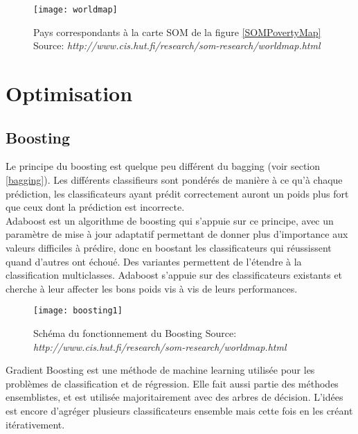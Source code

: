 \begin{figure}[H]
	\texttt{[image: worldmap]}
	\caption{\label{WorldPovertyMap} Pays correspondants à la carte SOM de la figure \ref{SOMPovertyMap} \newline Source: \textit{http://www.cis.hut.fi/research/som-research/worldmap.html}}
\end{figure}





\newpage
\section{Optimisation}

\subsection{Boosting}
Le principe du boosting est quelque peu différent du bagging (voir section \ref{bagging}). Les différents classifieurs sont pondérés de manière à ce qu’à chaque prédiction, les classificateurs ayant prédit correctement auront un poids plus fort que ceux dont la prédiction est incorrecte.\\


\noindent Adaboost est un algorithme de boosting qui s’appuie sur ce principe, avec un paramètre de mise à jour adaptatif permettant de donner plus d’importance aux valeurs difficiles à prédire, donc en boostant les classificateurs qui réussissent quand d’autres ont échoué. Des variantes permettent de l’étendre à la classification multiclasses. Adaboost s’appuie sur des classificateurs existants et cherche à leur affecter les bons poids vis à vis de leurs performances\cite{EnsembleMethods}.\\


\begin{figure}[H]
	\texttt{[image: boosting1]}
	\caption{\label{BoostingSchema}Schéma du fonctionnement du Boosting \newline Source: \textit{http://www.cis.hut.fi/research/som-research/worldmap.html}}
\end{figure}

\noindent Gradient Boosting est une méthode de machine learning utilisée pour les problèmes de classification et de régression. Elle fait aussi partie des méthodes ensemblistes, et est utilisée majoritairement avec des arbres de décision. L'idées est encore d'agréger plusieurs classificateurs ensemble mais cette fois en les créant itérativement.\\


